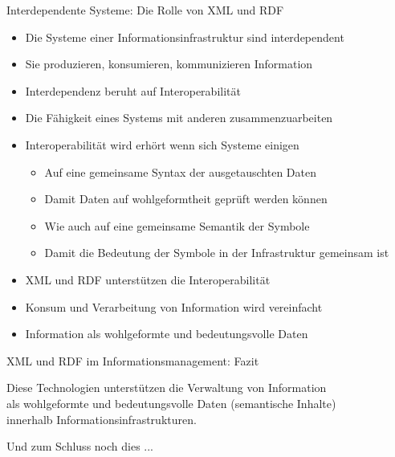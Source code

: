 \documentclass{beamer}
\begin{document}
\begin{frame}{Interdependente Systeme: Die Rolle von XML und RDF}
	
	\begin{itemize}
		\item Die Systeme einer Informationsinfrastruktur sind interdependent
		\item Sie produzieren, konsumieren, kommunizieren Information
		\item Interdependenz beruht auf Interoperabilität
		\item Die Fähigkeit eines Systems mit anderen zusammenzuarbeiten
		\item Interoperabilität wird erhört wenn sich Systeme einigen
		\begin{itemize}
			\item Auf eine gemeinsame Syntax der ausgetauschten Daten
			\item Damit Daten auf wohlgeformtheit geprüft werden können
			\item Wie auch auf eine gemeinsame Semantik der Symbole
			\item Damit die Bedeutung der Symbole in der Infrastruktur gemeinsam ist
		\end{itemize}
		\item XML und RDF unterstützen die Interoperabilität 
		\item Konsum und Verarbeitung von Information wird vereinfacht
		\item Information als wohlgeformte und bedeutungsvolle Daten
	\end{itemize}
	
\end{frame}

\begin{frame}{XML und RDF im Informationsmanagement: Fazit}
	
	\begin{center}
		Diese Technologien unterstützen die Verwaltung von Information\\als wohlgeformte und bedeutungsvolle Daten (semantische Inhalte)\\innerhalb Informationsinfrastrukturen.
	\end{center}
	
\end{frame}

\begin{frame}[plain]{}
	
	\large
	\begin{center}
		Und zum Schluss noch dies ...	
	\end{center}
	
\end{frame}
\end{document}
